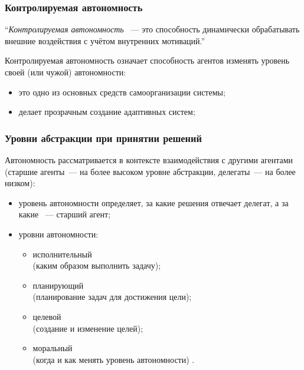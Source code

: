 \documentclass{beamer}
\begin{document}
\begin{frame}
  \frametitle{Контролируемая автономность}
  \begin{exampleblock}{}
    {\large ``{\it Контролируемая автономность} ~--- это способность динамически
    обрабатывать внешние воздействия с учётом внутренних мотиваций.''}
    \vskip5mm
    \hspace*{}
  \end{exampleblock}

  Контролируемая автономность означает способность агентов изменять
  уровень своей (или чужой) автономности:
  \begin{itemize}
    \item это одно из основных средств самоорганизации системы;
    \item делает прозрачным создание адаптивных систем;
  \end{itemize}
\end{frame}

\begin{frame}
  \frametitle{Уровни абстракции при принятии решений}
  Автономность рассматривается в контексте взаимодействия с другими агентами \cite{Falcone2001}
  (старшие агенты~--- на более высоком уровне абстракции, делегаты~--- на более низком):
  \begin{itemize}
    \item уровень автономности определяет, за какие решения отвечает делегат, а за какие ~--- старший агент;
    \item уровни автономности:
      \begin{itemize}
        \item исполнительный \\ (каким образом выполнить задачу);
        \item планирующий \\ (планирование задач для достижения цели);
        \item целевой \\ (создание и изменение целей);
        \item моральный \\ (когда и как менять уровень автономности) \cite{Verhagen2000}.
      \end{itemize}
  \end{itemize}
\end{frame}
\end{document}
